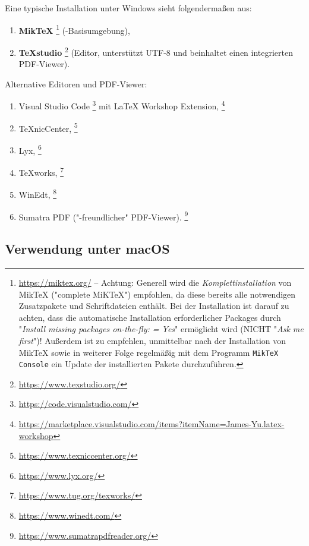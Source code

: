Eine typische Installation unter Windows sieht folgendermaßen aus:
%
\begin{enumerate}
\item \textbf{MikTeX}%
	\footnote{\url{https://miktex.org/} -- Achtung:
	Generell wird die \emph{Komplettinstallation} von MikTeX ("complete
	MiKTeX") empfohlen, da diese bereits alle notwendigen Zusatzpakete und
	Schriftdateien enthält. Bei der Installation ist darauf zu achten,
	dass die automatische Installation erforderlicher Packages durch
	"\emph{Install missing packages on-the-fly: = Yes}" ermöglicht wird
	(NICHT "\emph{Ask me first}")! Außerdem ist zu empfehlen, unmittelbar
	nach der Installation von MikTeX sowie in weiterer Folge regelmäßig
	mit dem Programm \texttt{MikTeX Console} ein Update der installierten
	Pakete durchzuführen.} (\latex-Basisumgebung),
\item \textbf{TeXstudio}%
	\footnote{\url{https://www.texstudio.org/}}
	(Editor, unterstützt UTF-8 und beinhaltet einen integrierten PDF-Viewer).
\end{enumerate}
%
Alternative Editoren und PDF-Viewer:
%
\begin{enumerate}
	\item Visual Studio Code%
	\footnote{\url{https://code.visualstudio.com/}}
	mit LaTeX Workshop Extension,%
	\footnote{\url{https://marketplace.visualstudio.com/items?itemName=James-Yu.latex-workshop}}
	\item TeXnicCenter,%
	\footnote{\url{https://www.texniccenter.org/}}
	\item Lyx,%
	\footnote{\url{https://www.lyx.org/}}
	\item TeXworks,%
	\footnote{\url{https://www.tug.org/texworks/}}
	\item WinEdt,%
	\footnote{\url{https://www.winedt.com/}}
	\item Sumatra PDF ("\latex-freundlicher" PDF-Viewer).%
	\footnote{\url{https://www.sumatrapdfreader.org/}}
\end{enumerate}

\subsection{Verwendung unter macOS}

